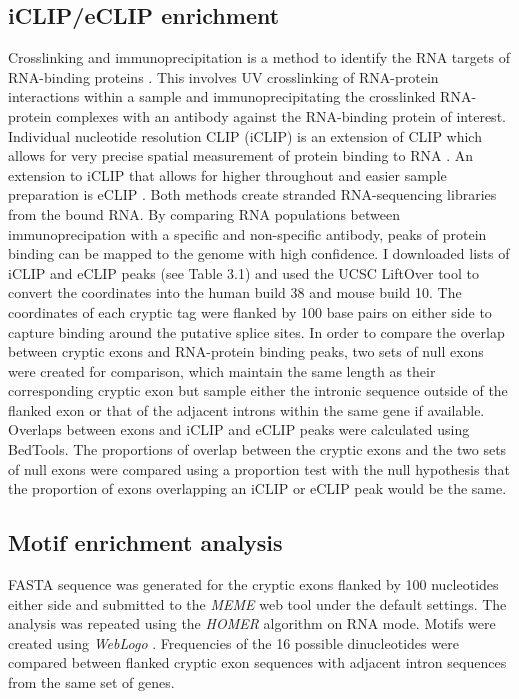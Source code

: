 \subsection{iCLIP/eCLIP enrichment}
Crosslinking and immunoprecipitation is a method to identify the RNA targets of RNA-binding proteins \citep{Ule2003}. This involves UV crosslinking of RNA-protein interactions within a sample and immunoprecipitating the crosslinked RNA-protein complexes with an antibody against the RNA-binding protein of interest. Individual nucleotide resolution CLIP (iCLIP) is an extension of CLIP which allows for very precise spatial measurement of protein binding to RNA  \citep{Huppertz2014-ip}. An extension to iCLIP that allows for higher throughout and easier sample preparation is eCLIP \citep{Van_Nostrand2016-su}. Both methods create stranded RNA-sequencing libraries from the bound RNA. By comparing RNA populations between immunoprecipation with a specific and non-specific antibody, peaks of protein binding can be mapped to the genome with high confidence. I downloaded lists of iCLIP and eCLIP peaks (see Table 3.1) and used the UCSC LiftOver tool to convert the coordinates into the human build 38 and mouse build 10.
The coordinates of each cryptic tag were flanked by 100 base pairs on either side to capture binding around the putative splice sites. In order to compare the overlap between cryptic exons and RNA-protein binding peaks, two sets of null exons were created for comparison, which maintain the same length as their corresponding cryptic exon but sample either the intronic sequence outside of the flanked exon or that of the adjacent introns within the same gene if available. Overlaps between exons and iCLIP and eCLIP peaks were calculated using BedTools. The proportions of overlap between the cryptic exons and the two sets of null exons were compared using a proportion test with the null hypothesis that the proportion of exons overlapping an iCLIP or eCLIP peak would be the same.

\subsection{Motif enrichment analysis}
FASTA sequence was generated for the cryptic exons flanked by 100 nucleotides either side and submitted to the \emph{MEME} web tool \citep{Bailey2009-lw} under the default settings. The analysis was repeated using the \emph{HOMER} algorithm \citep{Heinz2010-ym} on RNA mode. Motifs were created using \emph{WebLogo} \citep{Crooks2004-yg}. Frequencies of the 16 possible dinucleotides were compared between flanked cryptic exon sequences with adjacent intron sequences from the same set of genes.

